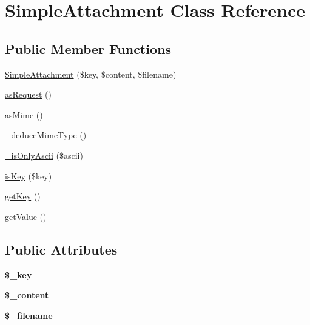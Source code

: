 \hypertarget{class_simple_attachment}{
\section{SimpleAttachment Class Reference}
\label{class_simple_attachment}
}
\subsection*{Public Member Functions}
\begin{DoxyCompactItemize}
\item 
\hyperlink{class_simple_attachment_a52aee178378d8a5ac82c62090c1e30a8}{SimpleAttachment} (\$key, \$content, \$filename)
\item 
\hyperlink{class_simple_attachment_a42ee771da24f26645168f42447def83a}{asRequest} ()
\item 
\hyperlink{class_simple_attachment_ad569cac30011632504cec6b9efdd16fb}{asMime} ()
\item 
\hyperlink{class_simple_attachment_a2294435511c40e35261be5b340774060}{\_\-deduceMimeType} ()
\item 
\hyperlink{class_simple_attachment_a59336f1cbc7ada48f8eb1015ec24ae65}{\_\-isOnlyAscii} (\$ascii)
\item 
\hyperlink{class_simple_attachment_aeae5164683f8bdee48fe3309d65a499f}{isKey} (\$key)
\item 
\hyperlink{class_simple_attachment_a234c2497dfc092030a936f23c9f34484}{getKey} ()
\item 
\hyperlink{class_simple_attachment_aa6ab36e0e77e134b86027413c87a7087}{getValue} ()
\end{DoxyCompactItemize}
\subsection*{Public Attributes}
\begin{DoxyCompactItemize}
\item 
\hypertarget{class_simple_attachment_ad69915ddbdd5f337d19d1ca4c3717b1f}{
{\bfseries \$\_\-key}}
\label{class_simple_attachment_ad69915ddbdd5f337d19d1ca4c3717b1f}

\item 
\hypertarget{class_simple_attachment_a44d6645fb4ac335eab1bfe47416a726b}{
{\bfseries \$\_\-content}}
\label{class_simple_attachment_a44d6645fb4ac335eab1bfe47416a726b}

\item 
\hypertarget{class_simple_attachment_aa54f3863722789df04aadd04906f43ee}{
{\bfseries \$\_\-filename}}
\label{class_simple_attachment_aa54f3863722789df04aadd04906f43ee}

\end{DoxyCompactItemize}


